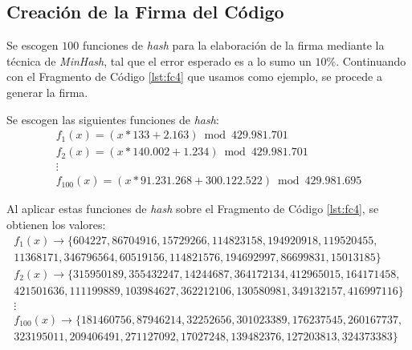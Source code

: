 \subsection{Creación de la Firma del Código}
\label{subsec:DesFirCod}

Se escogen $100$ funciones de \textit{hash} para la elaboración
de la firma mediante la técnica de \textit{MinHash},
tal que el error esperado es a lo sumo un $10\%$.
Continuando con el Fragmento de Código \ref{lst:fc4} que usamos como ejemplo,
se procede a generar la firma.

Se escogen las siguientes funciones de \textit{hash}:
\begin{gather*}
f_1(x) = (x * 133 + 2.163) \bmod 429.981.701 \\
f_2(x) = (x * 140.002 + 1.234) \bmod 429.981.701\\
\vdots \\
f_{100}(x) = (x * 91.231.268 + 300.122.522) \bmod 429.981.695
\end{gather*}
	





Al aplicar estas funciones de \textit{hash} sobre el Fragmento de Código \ref{lst:fc4}, se obtienen los valores:
\begin{gather*}
f_1(x) \rightarrow \{604227, 86704916, 15729266, 114823158, 194920918, 119520455,\\
							  11368171, 346796564, 60519156, 114821576, 194692997, 86699831, 15013185\}\\
f_2(x) \rightarrow \{315950189, 355432247, 14244687, 364172134, 412965015, 164171458,\\
							  421501636, 111199889, 103984627, 362212106, 130580981, 349132157, 416997116\}\\
\vdots\\
f_{100}(x) \rightarrow \{181460756, 87946214, 32252656, 301023389, 176237545, 260167737,\\
									 323195011, 209406491, 271127092, 17027248, 139482376, 127203813, 324373383\}
\end{gather*}

